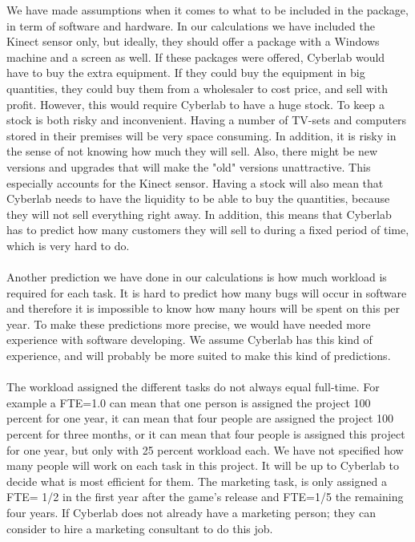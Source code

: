 We have made assumptions when it comes to what to be included in the package, in term of software and hardware. In our calculations we have included the Kinect sensor only, but ideally, they should offer a package with a Windows machine and a screen as well. If these packages were offered, Cyberlab would have to buy the extra equipment. If they could buy the equipment in big quantities, they could buy them from a wholesaler to cost price, and sell with profit. However, this would require Cyberlab to have a huge stock. To keep a stock is both risky and inconvenient. Having a number of TV-sets and computers stored in their premises will be very space consuming. In addition, it is risky in the sense of not knowing how much they will sell. Also, there might be new versions and upgrades that will make the "old" versions unattractive. This especially accounts for the Kinect sensor. Having a stock will also mean that Cyberlab needs to have the liquidity to be able to buy the quantities, because they will not sell everything right away. In addition, this means that Cyberlab has to predict how many customers they will sell to during a fixed period of time, which is very hard to do. \\ \\
Another prediction we have done in our calculations is how much workload is required for each task. It is hard to predict how many bugs will occur in software and therefore it is impossible to know how many hours will be spent on this per year. To make these predictions more precise, we would have needed more experience with software developing. We assume Cyberlab has this kind of experience, and will probably be more suited to make this kind of predictions.\\ \\
The workload assigned the different tasks do not always equal full-time. For example a FTE=1.0 can mean that one person is assigned the project 100 percent for one year, it can mean that four people are assigned the project 100 percent for three months, or it can mean that four people is assigned this project for one year, but only with 25 percent workload each. We have not specified how many people will work on each task in this project. It will be up to Cyberlab to decide what is most efficient for them. The marketing task, is only assigned a FTE= 1/2 in the first year after the game’s release and FTE=1/5 the remaining four years. If Cyberlab does not already have a marketing person; they can consider to hire a marketing consultant to do this job. \\ \\
